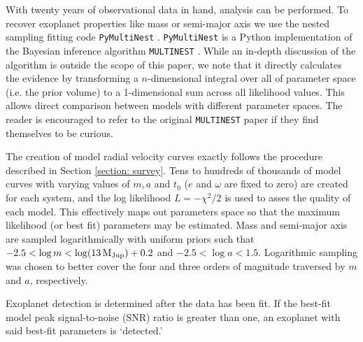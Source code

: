 \documentclass[12pt,manuscript]{aastex}
\begin{document}
With twenty years of observational data in hand, analysis can be performed. 
To recover exoplanet properties like mass or semi-major axis we use the nested sampling fitting code \texttt{PyMultiNest} \citep{buchner14}.
\texttt{PyMultiNest} is a Python implementation of the Bayesian inference algorithm \texttt{MULTINEST} \citep{feroz09}.
While an in-depth discussion of the algorithm is outside the scope of this paper, we note that it directly calculates the evidence by transforming a $n$-dimensional integral over all of parameter space (i.e. the prior volume) to a 1-dimensional sum across all likelihood values. 
This allows direct comparison between models with different parameter spaces.
The reader is encouraged to refer to the original \texttt{MULTINEST} paper if they find themselves to be curious.

The creation of model radial velocity curves exactly follows the procedure described in Section \ref{section: survey}.
Tens to hundreds of thousands of model curves with varying values of $m, a$ and $t_0$ ($e$ and $\omega$ are fixed to zero) are created for each system, and the log likelihood $L=-\chi^2/2$ is used to asses the quality of each model.
This effectively maps out parameters space so that the maximum likelihood (or best fit) parameters may be estimated.
Mass and semi-major axis are sampled logarithmically with uniform priors such that $-2.5 < \log m < \log (\SI{13}{M_{Jup}}) + 0.2$ and $-2.5 < \log a < 1.5$. 
Logarithmic sampling was chosen to better cover the four and three orders of magnitude traversed by $m$ and $a$, respectively.

Exoplanet detection is determined after the data has been fit. 
If the best-fit model peak signal-to-noise (SNR) ratio is greater than one, an exoplanet with said best-fit parameters is `detected.'

% 
\end{document}

